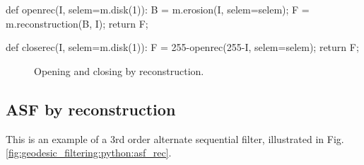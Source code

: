 \begin{python}
def openrec(I, selem=m.disk(1)):
    B = m.erosion(I, selem=selem);
    F = m.reconstruction(B, I);
    return F;
\end{python}

\begin{python}
def closerec(I, selem=m.disk(1)):
    F = 255-openrec(255-I, selem=selem);
    return F;
\end{python}

\begin{figure}[H]
 \centering\caption{Opening and closing by reconstruction.}%
 \hfill
 \hfill
 \label{fig:geodesic_filtering:python:georec}%
\end{figure}

\subsection{ASF by reconstruction}
This is an example of a 3rd order alternate sequential filter, illustrated in Fig.\ref{fig:geodesic_filtering:python:asf_rec}.


